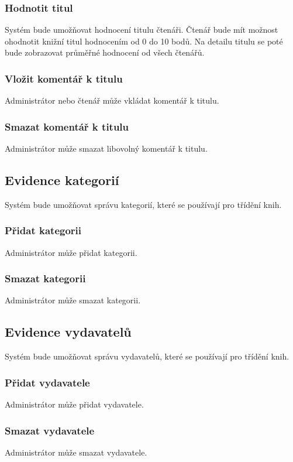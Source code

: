 \documentclass{article}
\begin{document}
\subsubsection{Hodnotit titul}
Systém bude umožňovat hodnocení titulu čtenáři. Čtenář bude mít možnost
ohodnotit knižní titul hodnocením od 0 do 10 bodů. Na detailu titulu se poté
bude zobrazovat průměřné hodnocení od všech čtenářů.

\subsubsection{Vložit komentář k titulu}
Administrátor nebo čtenář může vkládat komentář k titulu.

\subsubsection{Smazat komentář k titulu}
Administrátor může smazat libovolný komentář k titulu.

\subsection{Evidence kategorií}
Systém bude umožňovat správu kategorií, které se používají pro třídění knih.

\subsubsection{Přidat kategorii}
Administrátor může přidat kategorii.

\subsubsection{Smazat kategorii}
Administrátor může smazat kategorii.

\subsection{Evidence vydavatelů}
Systém bude umožňovat správu vydavatelů, které se používají pro třídění knih.

\subsubsection{Přidat vydavatele}
Administrátor může přidat vydavatele.

\subsubsection{Smazat vydavatele}
Administrátor může smazat vydavatele.
\end{document}
